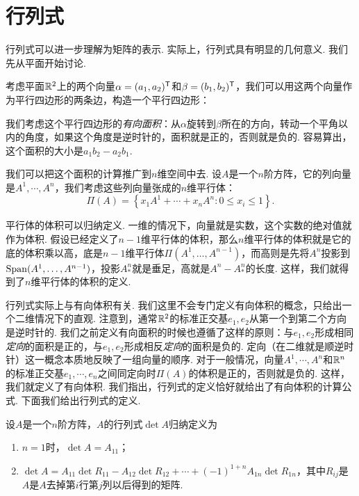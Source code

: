 \section{行列式}
行列式可以进一步理解为矩阵的表示. 实际上，行列式具有明显的几何意义. 我们先从平面开始讨论. 

考虑平面$\mathbb{R}^2$上的两个向量$\alpha=(a_1,a_2)^{\mathsf{T}}$和$\beta=(b_1,b_2)^{\mathsf{T}}$，我们可以用这两个向量作为平行四边形的两条边，构造一个平行四边形：
\begin{center}
\end{center}
我们考虑这个平行四边形的\emph{有向面积}：从$\alpha$旋转到$\beta$所在的方向，转动一个平角以内的角度，如果这个角度是逆时针的，面积就是正的，否则就是负的. 容易算出，这个面积的大小是$a_1b_2-a_2b_1$. 

我们可以把这个面积的计算推广到$n$维空间中去. 设$A$是一个$n$阶方阵，它的列向量是$A^1,\cdots,A^n$，我们考虑这些列向量张成的$n$维平行体：
\[\Pi(A)=\left\{x_1A^1+\cdots+x_nA^n:0\leq x_i\leq 1\right\}.\]

平行体的体积可以归纳定义. 一维的情况下，向量就是实数，这个实数的绝对值就作为体积. 假设已经定义了$n-1$维平行体的体积，那么$n$维平行体的体积就是它的底的体积乘以高，底是$n-1$维平行体$\Pi(A^1,\dots,A^{n-1})$，而高则是先将$A^n$投影到$\operatorname*{Span}(A^1,\dots,A^{n-1})$，投影$A^n_*$就是垂足，高就是$A^n-A^n_*$的长度. 这样，我们就得到了$n$维平行体的体积的定义. 

行列式实际上与有向体积有关. 我们这里不会专门定义有向体积的概念，只给出一个二维情况下的直观. 注意到，通常$\mathbb{R}^2$的标准正交基$e_1,e_2$从第一个到第二个方向是逆时针的. 我们之前定义有向面积的时候也遵循了这样的原则：与$e_1,e_2$形成相同\emph{定向}的面积是正的，与$e_1,e_2$形成相反\emph{定向}的面积是负的. 定向（在二维就是顺逆时针）这一概念本质地反映了一组向量的顺序. 对于一般情况，向量$A^1,\cdots,A^n$和$\mathbb{R}^n$的标准正交基$e_1,\cdots,e_n$之间同定向时$\Pi(A)$的体积是正的，否则就是负的. 这样，我们就定义了有向体积. 我们指出，行列式的定义恰好就给出了有向体积的计算公式. 下面我们给出行列式的定义. 

\begin{definition}[行列式]
    设$A$是一个$n$阶方阵，$A$的行列式$\det A$归纳定义为
\begin{enumerate}
    \item $n=1$时，$\det A=A_{11}$；
    \item $\det A=A_{11}\det R_{11}-A_{12}\det R_{12}+\cdots+(-1)^{1+n}A_{1n}\det R_{1n}$，其中$R_{ij}$是$A$是$A$去掉第$i$行第$j$列以后得到的矩阵. 
\end{enumerate}
\end{definition}

